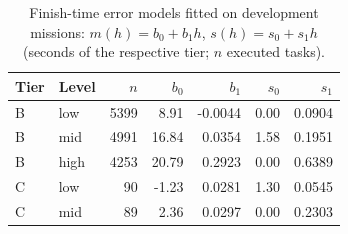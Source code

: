 \begin{table}[t]
\caption{Finish-time error models fitted on development missions: $m(h)=b_0+b_1h$, $s(h)=s_0+s_1h$ (seconds of the respective tier; $n$ executed tasks).}\label{tab:errmodels}
\centering\small
\begin{tabular}{llrrrrr}
\toprule
Tier & Level & $n$ & $b_0$ & $b_1$ & $s_0$ & $s_1$ \\
\midrule
B & low & 5399 & 8.91 & -0.0044 & 0.00 & 0.0904 \\
B & mid & 4991 & 16.84 & 0.0354 & 1.58 & 0.1951 \\
B & high & 4253 & 20.79 & 0.2923 & 0.00 & 0.6389 \\
C & low & 90 & -1.23 & 0.0281 & 1.30 & 0.0545 \\
C & mid & 89 & 2.36 & 0.0297 & 0.00 & 0.2303 \\
\bottomrule
\end{tabular}
\end{table}
